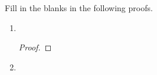 \begin{multicols}{2}
\begin{enumerate}[label=(\arabic*)]
\end{enumerate}
\end{multicols}

\noindent\problempart Fill in the blanks in the following proofs.

\begin{enumerate}[label=(\arabic*)]
\item \textcolor{white}{.}  
\vspace{-20pt} %
\begin{proof}
 
	\open
	 
		\open
		 
		 
		 
		 
		\close
	 
	 
	 
	\close
{} 			
\end{proof}



\item \textcolor{white}{.}  
\vspace{-18pt} %


\end{enumerate}

